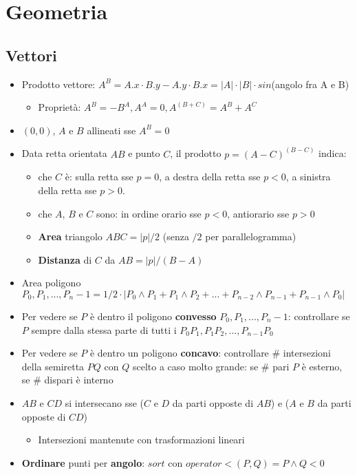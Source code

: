 \section{Geometria}

\subsection{Vettori}
\begin{itemize}
    \item Prodotto vettore: $A^B = A.x\cdot B.y - A.y\cdot B.x = |A|\cdot|B|\cdot sin$(angolo fra A e B)
    \begin{itemize}
        \item Proprietà: $A^B = -B^A, A^A = 0, A^{(B+C)} = A^B + A^C$
    \end{itemize}
    \item $(0,0)$, $A$ e $B$ allineati sse $A^B = 0$
    \item Data retta orientata $AB$ e punto $C$, il prodotto $p=(A-C)^{(B-C)}$ indica:
    \begin{itemize}
        \item che $C$ è: sulla retta sse $p=0$, a destra della retta sse $p<0$, a sinistra della retta sse $p>0$.
        \item che $A$, $B$ e $C$ sono: in ordine orario sse $p<0$, antiorario sse $p>0$
        \item \textbf{Area} triangolo $ABC = |p|/2$ (senza $/2$ per parallelogramma)
        \item \textbf{Distanza} di $C$ da $AB = |p|/(B-A)$
    \end{itemize}
    \item Area poligono $P_0, P_1, ..., P_n-1 = 1/2 \cdot |P_0 \wedge P_1 + P_1 \wedge P_2 + ... + P_{n-2} \wedge P_{n-1} + P_{n-1} \wedge P_0|$
    \item Per vedere se $P$ è dentro il poligono \textbf{convesso} $P_0, P_1, ..., P_n-1$: controllare se $P$ sempre dalla stessa parte di tutti i $P_0P_1, P_1P_2, ..., P_{n-1}P_0$
    \item Per vedere se $P$ è dentro un poligono \textbf{concavo}: controllare $\#$ intersezioni della semiretta $PQ$ con $Q$ scelto a caso molto grande: se $\#$ pari $P$ è esterno, se $\#$ dispari è interno
    \item $AB$ e $CD$ si intersecano sse ($C$ e $D$ da parti opposte di $AB$) e ($A$ e $B$ da parti opposte di $CD$)
    \begin{itemize}
        \item Intersezioni mantenute con trasformazioni lineari
    \end{itemize}
    \item \textbf{Ordinare} punti per \textbf{angolo}: $sort$ con $operator<(P,Q) = P \wedge Q < 0$
\end{itemize}

